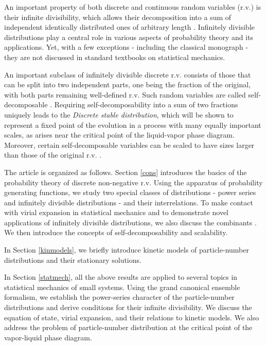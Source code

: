 \documentclass[a4paper,12pt]{amsart}
\theoremstyle{definition}
\theoremstyle{remark}
\begin{document}
An important property of both discrete and continuous random variables (r.v.) is their infinite divisibility, which allows their decomposition into a sum of independent identically distributed ones of arbitrary length \cite{Feller1, StvH2004, JKK2005}. Infinitely divisible distributions play a central role in various aspects of probability theory and its applications. Yet, with a few exceptions - including the classical monograph \cite{Hill} - they are not discussed in standard textbooks on statistical mechanics. 

An important subclass of infinitely divisible discrete r.v. consists of those that can be split into two independent parts, one being the fraction of the original, with both parts remaining well-defined r.v. Such random variables are called self-decomposable \cite{StvH2004}. Requiring self-decomposability into a sum of two fractions uniquely leads to the {\it Discrete stable distribution}, which will be shown to represent a fixed point of the evolution in a process with many equally important scales, as arises near the critical point of the liquid-vapor phase diagram. Moreover, certain self-decomposable variables can be scaled to have sizes larger than those of the original r.v. \cite{Klebanov2023-xj, KlSum2026}. 

The article is organized as follows. Section \ref{cons} introduces the basics of the probability theory of discrete non-negative r.v. Using the apparatus of probability generating functions, we study two special classes of distributions - power series and infinitely divisible distributions - and their interrelations. To make contact with virial expansion in statistical mechanics and to demonstrate novel applications of infinitely divisible distributions, we also discuss the combinants \cite{Kauffmann:1978vw}. We then introduce the concepts of self-decomposability and scalability.  

In Section \ref{kinmodels}, we briefly introduce kinetic models of particle-number distributions and their stationary solutions.

In Section \ref{statmech}, all the above results are applied to several topics in statistical mechanics of small systems. Using the grand canonical ensemble formalism, we establish the power-series character of the particle-number distributions and derive conditions for their infinite divisibility. We discuss the equation of state, virial expansion, and their relations to kinetic models. We also address the problem of particle-number distribution at the critical point of the vapor-liquid phase diagram. 
\end{document}
